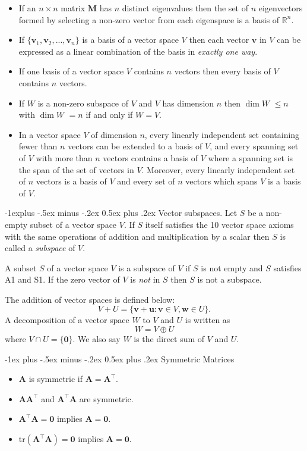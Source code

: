 \documentclass[12pt,landscape, a4paper]{article}
\makeatletter
\newcommand{\bs}[1]{\ensuremath{\boldsymbol{#1}}}
\newcommand{\tp}{{\!\scriptscriptstyle \top}}
\renewcommand{\section}{\@startsection{section}{1}{0mm}%
                                {-1ex plus -.5ex minus -.2ex}%
                                {0.5ex plus .2ex}%
                                {\normalfont\large\bfseries}}
\renewcommand{\subsection}{\@startsection{subsection}{2}{0mm}%
                                {-1explus -.5ex minus -.2ex}%
                                {0.5ex plus .2ex}%
                                {\normalfont\normalsize\bfseries}}
\makeatother
\begin{document}
\begin{multicols}{3}
\begin{itemize}
	\item If an $n\times n$ matrix $\bs{M}$ has $n$ distinct eigenvalues then the set of $n$ eigenvectors formed by selecting a non-zero vector from each eigenspace is a basis of $\mathbb{R}^n$.
	\item If $\{\bs{v}_1, \bs{v}_2, ..., \bs{v}_n \}$ is a basis of a vector space $V$ then each vector $\bs{v}$ in $V$ can be expressed as a linear combination of the basis in \emph{exactly one way}.
	\item If one basis of a vector space $V$ contains $n$ vectors then every basis of $V$ contains $n$ vectors.
	\item If $W$ is a non-zero subspace of $V$ and $V$ has dimension $n$ then $\dim W$ $\leq n$  with $\dim W$ $=n$ if and only if $W=V$.
	\item In a vector space $V$ of dimension $n$, every linearly independent set containing fewer than $n$ vectors can be extended to a basis of $V$, and every spanning set of $V$ with more than $n$ vectors contains a basis of $V$ where a spanning set is the span of the set of vectors in $V$. Moreover, every linearly independent set of $n$ vectors is a basis of $V$ and every set of $n$ vectors which spans $V$ is a basis of $V$.
\end{itemize}

\subsection{Vector subspaces}.
Let $S$ be a non-empty subset of a vector space $V$. If $S$ itself satisfies the 10 vector space axioms with the same operations of addition and multiplication by a scalar then $S$ is called a \emph{subspace} of $V$. 

A subset $S$ of a vector space $V$ is a subspace of $V$ if $S$ is not empty and $S$ satisfies A1 and S1. If the zero vector of $V$ is \emph{not} in $S$ then $S$ is not a subspace.

The addition of vector spaces is defined below:
$$V + U = \{\bs{v} + \bs{u}: \bs{v}\in V,\bs{w}\in U\}.$$
A decomposition of a vector space $W$ to $V$ and $U$ is written as 
$$  W = V \oplus U$$ 
where $V \cap U = \{\bs{0}\}$. We also say $W$ is the direct sum of $V$ and $U$. 



\section{Symmetric Matrices}
\begin{itemize}
	\item $\bs{A}$ is symmetric if $\bs{A} = \bs{A}^\tp$.
	\item $\bs{A}\bs{A}^\tp$ and $\bs{A}^\tp\bs{A}$ are symmetric. 
	\item $\bs{A}^\tp\bs{A} = \bs{0}$ implies $\bs{A} = \bs{0}$.
	\item $\text{tr}\left(\bs{A}^\tp\bs{A}\right) = \bs{0}$ implies $\bs{A} = \bs{0}$.
\end{itemize}


\end{multicols}
\end{document}
